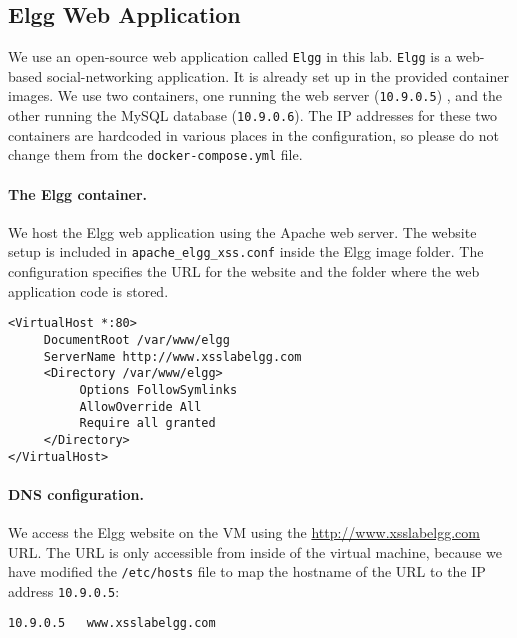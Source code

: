 



\subsection{Elgg Web Application}


We use an open-source web application called {\tt Elgg} in this lab.
{\tt Elgg} is a web-based social-networking application.
It is already set up in the provided container images.
We use two containers, one running the web server (\texttt{10.9.0.5}) ,
and the other running the MySQL database (\texttt{10.9.0.6}). 
The IP addresses for these two containers are hardcoded in various 
places in the configuration, so please do not change them from
the \texttt{docker-compose.yml} file. 

\paragraph{The Elgg container.}
We host the Elgg web application using the Apache web server. 
The website setup is included in 
\texttt{apache\_elgg\_xss.conf} inside the Elgg image folder. 
The configuration specifies the URL for the website and 
the folder where the web application code is stored. 

\begin{lstlisting}
<VirtualHost *:80>
     DocumentRoot /var/www/elgg
     ServerName http://www.xsslabelgg.com
     <Directory /var/www/elgg>
          Options FollowSymlinks
          AllowOverride All
          Require all granted
     </Directory>
</VirtualHost>
\end{lstlisting}


\paragraph{DNS configuration.} 
We access the Elgg website on the VM using 
the \url{http://www.xsslabelgg.com} URL.
The URL is only accessible from inside of the virtual machine, because we
have modified the \texttt{/etc/hosts} file to map the hostname
of the URL to the IP address \texttt{10.9.0.5}:

\begin{lstlisting}
10.9.0.5   www.xsslabelgg.com
\end{lstlisting}


